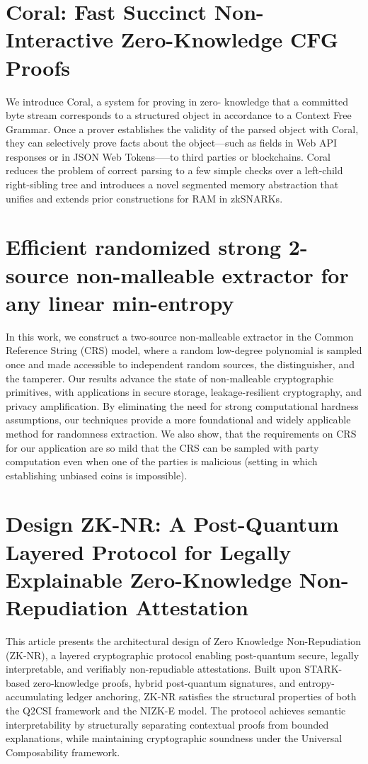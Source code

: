 \documentclass[11pt,oneside]{book}
\theoremstyle{definition}
\theoremstyle{remark}
\theoremstyle{plain}
\begin{document}
\section{\cite{cryptoeprint:2025/1420} Coral: Fast Succinct Non-Interactive Zero-Knowledge CFG Proofs}
We introduce Coral, a system for proving in zero-
knowledge that a committed byte stream corresponds to a
structured object in accordance to a Context Free Grammar.
Once a prover establishes the validity of the parsed object with Coral, they can selectively prove facts about the object—such as fields in Web API responses or in JSON Web Tokens—–to third
parties or blockchains. Coral reduces the problem of correct
parsing to a few simple checks over a left-child right-sibling tree and introduces a novel segmented memory abstraction that
unifies and extends prior constructions for RAM in zkSNARKs.

\section{\cite{cryptoeprint:2025/1421} Efficient randomized strong 2-source non-malleable extractor for any linear min-entropy}
In this work, we construct a two-source non-malleable extractor in the Common Reference String (CRS) model, where a random low-degree polynomial is sampled once and made accessible to independent random sources, the distinguisher, and the tamperer.
Our results advance the state of non-malleable cryptographic primitives, with applications in secure storage, leakage-resilient cryptography, and privacy amplification. By eliminating the need for strong computational hardness assumptions, our techniques provide a more foundational and widely applicable method for randomness extraction.
We also show, that the requirements on CRS for our application are so mild that the CRS can be sampled with 
 party computation even when one of the parties is malicious (setting in which establishing unbiased coins is impossible).
\section{\cite{cryptoeprint:2025/1422} Design ZK-NR: A Post-Quantum Layered Protocol for Legally Explainable Zero-Knowledge Non-Repudiation Attestation}
This article presents the architectural design of Zero Knowledge Non-Repudiation (ZK-NR), a layered cryptographic protocol enabling post-quantum secure, legally interpretable, and verifiably non-repudiable attestations. Built upon STARK-based zero-knowledge proofs, hybrid post-quantum signatures, and entropy-accumulating ledger anchoring, ZK-NR satisfies the structural properties of both the Q2CSI framework and the NIZK-E model. The protocol achieves semantic interpretability by structurally separating contextual proofs from bounded explanations, while maintaining cryptographic soundness under the Universal Composability framework. 
\end{document}

